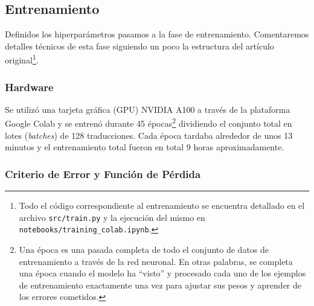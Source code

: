 \subsection{Entrenamiento}

Definidos los hiperparámetros pasamos a la fase de entrenamiento. Comentaremos detalles técnicos de esta fase siguiendo un poco la estructura 
del artículo original\footnote{Todo el código correspondiente al entrenamiento se encuentra detallado en el archivo \texttt{src/train.py} y 
la ejecución del mismo en  \texttt{notebooks/training\_colab.ipynb}.}.

\subsubsection{Hardware}
Se utilizó una tarjeta gráfica (GPU) NVIDIA A100 a través de la plataforma Google Colab y se entrenó durante 45 épocas\footnote{Una época es 
una pasada completa de todo el conjunto de datos de entrenamiento a través de la red neuronal.
En otras palabras, se completa una época cuando el modelo ha ``visto'' y procesado cada uno de los ejemplos de entrenamiento exactamente 
una vez para ajustar sus pesos y aprender de los errores cometidos.} dividiendo el conjunto total en lotes (\textit{batches}) de 128 traducciones. 
Cada época tardaba alrededor de unos 13 minutos y el entrenamiento total fueron en total $9$ horas aproximadamente.

\subsubsection{Criterio de Error y Función de Pérdida}


